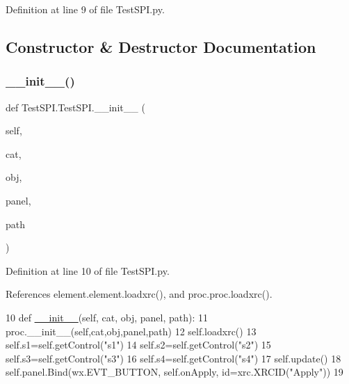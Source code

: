 Definition at line 9 of file Test\+S\+P\+I.\+py.



\subsection{Constructor \& Destructor Documentation}
\mbox{\label{classTestSPI_1_1TestSPI_abe1733d29b3ba96fda6ef9b2dd69f5f5}} 
\subsubsection{\texorpdfstring{\+\_\+\+\_\+init\+\_\+\+\_\+()}{\_\_init\_\_()}}
{\footnotesize\ttfamily def Test\+S\+P\+I.\+Test\+S\+P\+I.\+\_\+\+\_\+init\+\_\+\+\_\+ (\begin{DoxyParamCaption}\item[{}]{self,  }\item[{}]{cat,  }\item[{}]{obj,  }\item[{}]{panel,  }\item[{}]{path }\end{DoxyParamCaption})}



Definition at line 10 of file Test\+S\+P\+I.\+py.



References element.\+element.\+loadxrc(), and proc.\+proc.\+loadxrc().


\begin{DoxyCode}
10     \textcolor{keyword}{def }\hyperlink{classwrapper_1_1ModuleDictWrapper_a9a7a794150502f51df687831583e13b9}{\_\_init\_\_}(self, cat, obj, panel, path):
11         proc.\_\_init\_\_(self,cat,obj,panel,path)
12         self.loadxrc()
13         self.s1=self.getControl(\textcolor{stringliteral}{"s1"})
14         self.s2=self.getControl(\textcolor{stringliteral}{"s2"})
15         self.s3=self.getControl(\textcolor{stringliteral}{"s3"})
16         self.s4=self.getControl(\textcolor{stringliteral}{"s4"})
17         self.update()
18         self.panel.Bind(wx.EVT\_BUTTON, self.onApply, id=xrc.XRCID(\textcolor{stringliteral}{"Apply"}))
19 
\end{DoxyCode}


